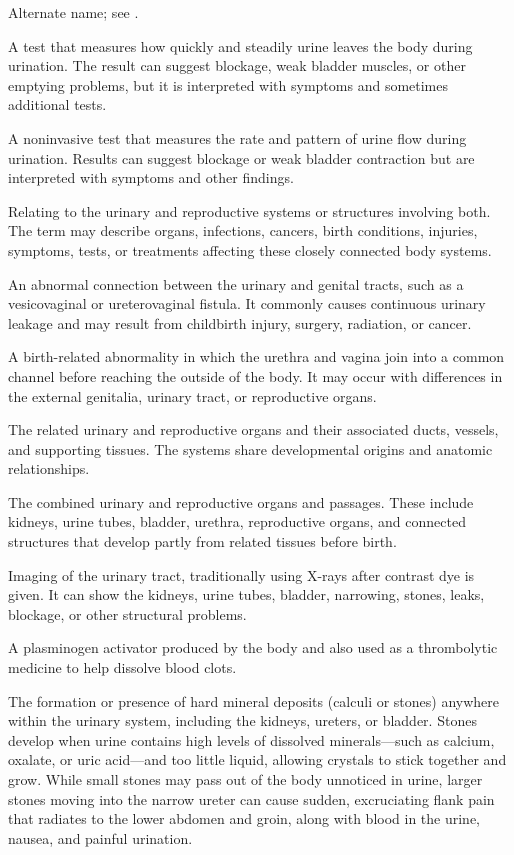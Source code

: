  Alternate name; see .

 A test that measures how quickly and steadily urine leaves the body during urination. The result can suggest blockage, weak bladder muscles, or other emptying problems, but it is interpreted with symptoms and sometimes additional tests.

 A noninvasive test that measures the rate and pattern of urine flow during urination. Results can suggest blockage or weak bladder contraction but are interpreted with symptoms and other findings.

 Relating to the urinary and reproductive systems or structures involving both. The term may describe organs, infections, cancers, birth conditions, injuries, symptoms, tests, or treatments affecting these closely connected body systems.

 An abnormal connection between the urinary and genital tracts, such as a vesicovaginal or ureterovaginal fistula. It commonly causes continuous urinary leakage and may result from childbirth injury, surgery, radiation, or cancer.

 A birth-related abnormality in which the urethra and vagina join into a common channel before reaching the outside of the body. It may occur with differences in the external genitalia, urinary tract, or reproductive organs.

 The related urinary and reproductive organs and their associated ducts, vessels, and supporting tissues. The systems share developmental origins and anatomic relationships.

 The combined urinary and reproductive organs and passages. These include kidneys, urine tubes, bladder, urethra, reproductive organs, and connected structures that develop partly from related tissues before birth.

 Imaging of the urinary tract, traditionally using X-rays after contrast dye is given. It can show the kidneys, urine tubes, bladder, narrowing, stones, leaks, blockage, or other structural problems.

 A plasminogen activator produced by the body and also used as a thrombolytic medicine to help dissolve blood clots.

 The formation or presence of hard mineral deposits (calculi or stones) anywhere within the urinary system, including the kidneys, ureters, or bladder. Stones develop when urine contains high levels of dissolved minerals---such as calcium, oxalate, or uric acid---and too little liquid, allowing crystals to stick together and grow. While small stones may pass out of the body unnoticed in urine, larger stones moving into the narrow ureter can cause sudden, excruciating flank pain that radiates to the lower abdomen and groin, along with blood in the urine, nausea, and painful urination.

